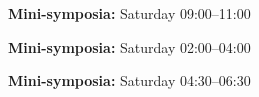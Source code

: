 \begin{center}
\label{mini-saturday1}
{\large {\bf Mini-symposia:} Saturday 09:00--11:00}
\end{center}
\vspace{1ex}






\begin{center}
\label{mini-saturday2}
{\large {\bf Mini-symposia:} Saturday 02:00--04:00}
\end{center}
\vspace{1ex}





\begin{center}
\label{mini-saturday3}
{\large {\bf Mini-symposia:} Saturday 04:30--06:30}
\end{center}
\vspace{1ex}


